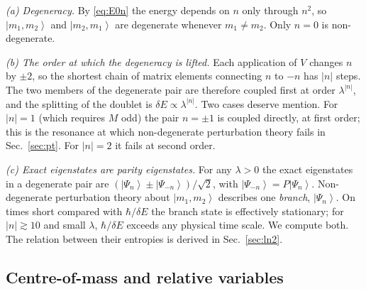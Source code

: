 \documentclass[preprint,12pt]{elsarticle}
\newcommand{\ket}[1]{\left|#1\right\rangle}
\begin{document}
\emph{(a) Degeneracy.} By \eqref{eq:E0n} the energy depends on $n$ only through
$n^{2}$, so $\ket{m_{1},m_{2}}$ and $\ket{m_{2},m_{1}}$ are degenerate whenever
$m_{1}\neq m_{2}$. Only $n=0$ is non-degenerate.

\emph{(b) The order at which the degeneracy is lifted.} Each application of $V$
changes $n$ by $\pm2$, so the shortest chain of matrix elements connecting $n$
to $-n$ has $|n|$ steps. The two members of the degenerate pair are therefore
coupled first at order $\lambda^{|n|}$, and the splitting of the doublet is
$\delta E\propto\lambda^{|n|}$. Two cases deserve mention. For $|n|=1$ (which
requires $M$ odd) the pair $n=\pm1$ is coupled directly, at first order; this is
the resonance at which non-degenerate perturbation theory fails in
Sec.~\ref{sec:pt}. For $|n|=2$ it fails at second order.

\emph{(c) Exact eigenstates are parity eigenstates.} For any $\lambda>0$ the
exact eigenstates in a degenerate pair are $(\ket{\Psi_{n}}\pm\ket{\Psi_{-n}})/
\sqrt2$, with $\ket{\Psi_{-n}}=P\ket{\Psi_{n}}$. Non-degenerate perturbation
theory about $\ket{m_{1},m_{2}}$ describes one \emph{branch}, $\ket{\Psi_{n}}$.
On times short compared with $\hbar/\delta E$ the branch state is effectively
stationary; for $|n|\gtrsim10$ and small $\lambda$, $\hbar/\delta E$ exceeds any
physical time scale. We compute both. The relation between their entropies is
derived in Sec.~\ref{sec:ln2}.

\subsection{Centre-of-mass and relative variables}
\label{sec:cmrel}
\end{document}
